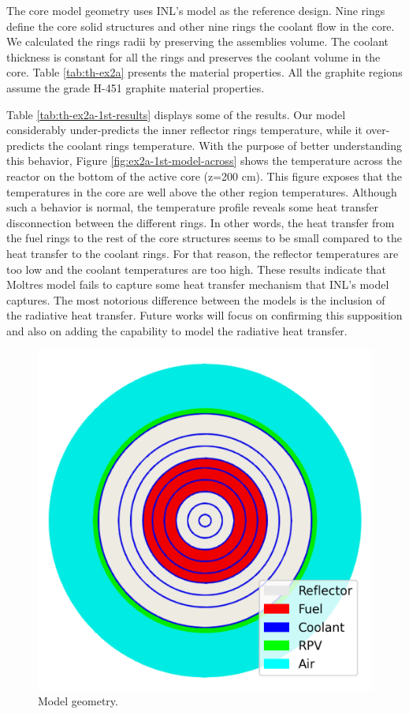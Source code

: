 The core model geometry uses INL's model as the reference design.
Nine rings define the core solid structures and other nine rings the coolant flow in the core.
We calculated the rings radii by preserving the assemblies volume.
The coolant thickness is constant for all the rings and preserves the coolant volume in the core.
Table \ref{tab:th-ex2a} presents the material properties.
All the graphite regions assume the grade H-451 graphite material properties.

Table \ref{tab:th-ex2a-1st-results} displays some of the results.
Our model considerably under-predicts the inner reflector rings temperature, while it over-predicts the coolant rings temperature.
With the purpose of better understanding this behavior, Figure \ref{fig:ex2a-1st-model-across} shows the temperature across the reactor on the bottom of the active core (z=200 cm).
This figure exposes that the temperatures in the core are well above the other region temperatures.
Although such a behavior is normal, the temperature profile reveals some heat transfer disconnection between the different rings.
In other words, the heat transfer from the fuel rings to the rest of the core structures seems to be small compared to the heat transfer to the coolant rings.
For that reason, the reflector temperatures are too low and the coolant temperatures are too high.
These results indicate that Moltres model fails to capture some heat transfer mechanism that INL's model captures.
The most notorious difference between the models is the inclusion of the radiative heat transfer.
Future works will focus on confirming this supposition and also on adding the capability to model the radiative heat transfer.

\begin{figure}[htbp!]
  \centering
  \includegraphics[width=0.45\linewidth]{figures-thermal/ex2a-meshD2}
  \hfill
  \caption{Model geometry.}
  \label{fig:ex2a-1st-model}
\end{figure}

